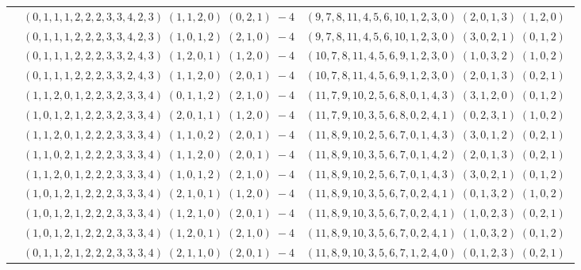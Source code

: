\documentclass[11pt]{article}
\begin{document}
\begin{longtable}[l]{|c|c|c|}
 \cline{2-3} 
 & $(0 ,1 ,1 ,1 ,2 ,2 ,2 ,3 ,3 ,4 ,2 ,3) \;(1 ,1 ,2 ,0) \;(0 ,2 ,1) \;-4$ & $(9 ,7 ,8 ,11 ,4 ,5 ,6 ,10 ,1 ,2 ,3 ,0) \;(2 ,0 ,1 ,3) \;(1 ,2 ,0) \;$\\ 
 \cline{2-3} 
 & $(0 ,1 ,1 ,1 ,2 ,2 ,2 ,3 ,3 ,4 ,2 ,3) \;(1 ,0 ,1 ,2) \;(2 ,1 ,0) \;-4$ & $(9 ,7 ,8 ,11 ,4 ,5 ,6 ,10 ,1 ,2 ,3 ,0) \;(3 ,0 ,2 ,1) \;(0 ,1 ,2) \;$\\ 
 \cline{2-3} 
 & $(0 ,1 ,1 ,1 ,2 ,2 ,2 ,3 ,3 ,2 ,4 ,3) \;(1 ,2 ,0 ,1) \;(1 ,2 ,0) \;-4$ & $(10 ,7 ,8 ,11 ,4 ,5 ,6 ,9 ,1 ,2 ,3 ,0) \;(1 ,0 ,3 ,2) \;(1 ,0 ,2) \;$\\ 
 \cline{2-3} 
 & $(0 ,1 ,1 ,1 ,2 ,2 ,2 ,3 ,3 ,2 ,4 ,3) \;(1 ,1 ,2 ,0) \;(2 ,0 ,1) \;-4$ & $(10 ,7 ,8 ,11 ,4 ,5 ,6 ,9 ,1 ,2 ,3 ,0) \;(2 ,0 ,1 ,3) \;(0 ,2 ,1) \;$\\ 
 \cline{2-3} 
 & $(1 ,1 ,2 ,0 ,1 ,2 ,2 ,3 ,2 ,3 ,3 ,4) \;(0 ,1 ,1 ,2) \;(2 ,1 ,0) \;-4$ & $(11 ,7 ,9 ,10 ,2 ,5 ,6 ,8 ,0 ,1 ,4 ,3) \;(3 ,1 ,2 ,0) \;(0 ,1 ,2) \;$\\ 
 \cline{2-3} 
 & $(1 ,0 ,1 ,2 ,1 ,2 ,2 ,3 ,2 ,3 ,3 ,4) \;(2 ,0 ,1 ,1) \;(1 ,2 ,0) \;-4$ & $(11 ,7 ,9 ,10 ,3 ,5 ,6 ,8 ,0 ,2 ,4 ,1) \;(0 ,2 ,3 ,1) \;(1 ,0 ,2) \;$\\ 
 \cline{2-3} 
 & $(1 ,1 ,2 ,0 ,1 ,2 ,2 ,2 ,3 ,3 ,3 ,4) \;(1 ,1 ,0 ,2) \;(2 ,0 ,1) \;-4$ & $(11 ,8 ,9 ,10 ,2 ,5 ,6 ,7 ,0 ,1 ,4 ,3) \;(3 ,0 ,1 ,2) \;(0 ,2 ,1) \;$\\ 
 \cline{2-3} 
 & $(1 ,1 ,0 ,2 ,1 ,2 ,2 ,2 ,3 ,3 ,3 ,4) \;(1 ,1 ,2 ,0) \;(2 ,0 ,1) \;-4$ & $(11 ,8 ,9 ,10 ,3 ,5 ,6 ,7 ,0 ,1 ,4 ,2) \;(2 ,0 ,1 ,3) \;(0 ,2 ,1) \;$\\ 
 \cline{2-3} 
 & $(1 ,1 ,2 ,0 ,1 ,2 ,2 ,2 ,3 ,3 ,3 ,4) \;(1 ,0 ,1 ,2) \;(2 ,1 ,0) \;-4$ & $(11 ,8 ,9 ,10 ,2 ,5 ,6 ,7 ,0 ,1 ,4 ,3) \;(3 ,0 ,2 ,1) \;(0 ,1 ,2) \;$\\ 
 \cline{2-3} 
 & $(1 ,0 ,1 ,2 ,1 ,2 ,2 ,2 ,3 ,3 ,3 ,4) \;(2 ,1 ,0 ,1) \;(1 ,2 ,0) \;-4$ & $(11 ,8 ,9 ,10 ,3 ,5 ,6 ,7 ,0 ,2 ,4 ,1) \;(0 ,1 ,3 ,2) \;(1 ,0 ,2) \;$\\ 
 \cline{2-3} 
 & $(1 ,0 ,1 ,2 ,1 ,2 ,2 ,2 ,3 ,3 ,3 ,4) \;(1 ,2 ,1 ,0) \;(2 ,0 ,1) \;-4$ & $(11 ,8 ,9 ,10 ,3 ,5 ,6 ,7 ,0 ,2 ,4 ,1) \;(1 ,0 ,2 ,3) \;(0 ,2 ,1) \;$\\ 
 \cline{2-3} 
 & $(1 ,0 ,1 ,2 ,1 ,2 ,2 ,2 ,3 ,3 ,3 ,4) \;(1 ,2 ,0 ,1) \;(2 ,1 ,0) \;-4$ & $(11 ,8 ,9 ,10 ,3 ,5 ,6 ,7 ,0 ,2 ,4 ,1) \;(1 ,0 ,3 ,2) \;(0 ,1 ,2) \;$\\ 
 \cline{2-3} 
 & $(0 ,1 ,1 ,2 ,1 ,2 ,2 ,2 ,3 ,3 ,3 ,4) \;(2 ,1 ,1 ,0) \;(2 ,0 ,1) \;-4$ & $(11 ,8 ,9 ,10 ,3 ,5 ,6 ,7 ,1 ,2 ,4 ,0) \;(0 ,1 ,2 ,3) \;(0 ,2 ,1) \;$\\ 

\end{longtable}
\end{document}
